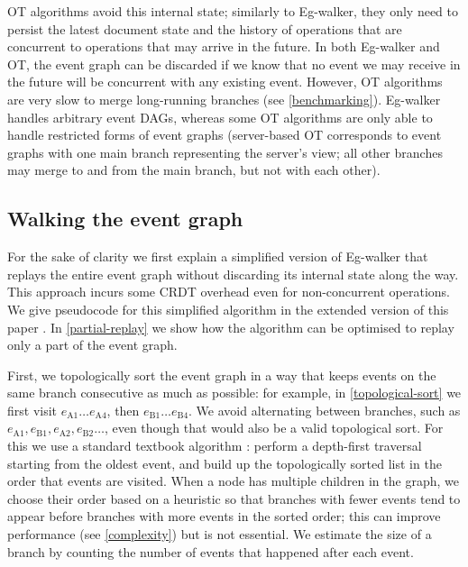\documentclass[sigplan,10pt]{acmart}
\newif\ifincludeappendix
\newcommand{\algname}{Eg-walker\xspace}
\begin{document}
OT algorithms avoid this internal state; similarly to \algname, they only need to persist the latest document state and the history of operations that are concurrent to operations that may arrive in the future.
In both \algname and OT, the event graph can be discarded if we know that no event we may receive in the future will be concurrent with any existing event.
However, OT algorithms are very slow to merge long-running branches (see \autoref{benchmarking}).
\algname handles arbitrary event DAGs, whereas some OT algorithms are only able to handle restricted forms of event graphs (server-based OT corresponds to event graphs with one main branch representing the server's view; all other branches may merge to and from the main branch, but not with each other).

\subsection{Walking the event graph}\label{graph-walk}

For the sake of clarity we first explain a simplified version of \algname that replays the entire event graph without discarding its internal state along the way. This approach incurs some CRDT overhead even for non-concurrent operations.
We give pseudocode for this simplified algorithm in \ifincludeappendix\autoref{pseudocode-appendix}\else the extended version of this paper \cite{extended-version}\fi.
In \autoref{partial-replay} we show how the algorithm can be optimised to replay only a part of the event graph.

First, we topologically sort the event graph in a way that keeps events on the same branch consecutive as much as possible: for example, in \autoref{topological-sort} we first visit $e_\mathrm{A1} \dots e_\mathrm{A4}$, then $e_\mathrm{B1} \dots e_\mathrm{B4}$. We avoid alternating between branches, such as $e_\mathrm{A1}, e_\mathrm{B1}, e_\mathrm{A2}, e_\mathrm{B2} \dots$, even though that would also be a valid topological sort.
For this we use a standard textbook algorithm \cite{CLRS2009}: perform a depth-first traversal starting from the oldest event, and build up the topologically sorted list in the order that events are visited.
When a node has multiple children in the graph, we choose their order based on a heuristic so that branches with fewer events tend to appear before branches with more events in the sorted order; this can improve performance (see \autoref{complexity}) but is not essential.
We estimate the size of a branch by counting the number of events that happened after each event.
\end{document}
